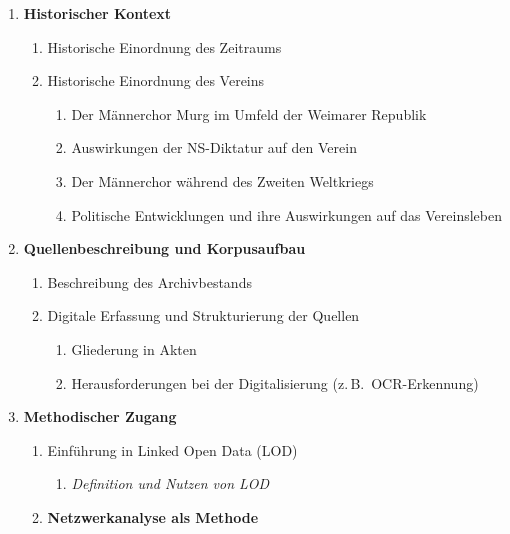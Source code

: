 \documentclass[12pt, a4paper, ngerman, bidi=default]{article}
\begin{document}
\begin{spacing}{1.5}
\begin{enumerate}
    \item \textbf{Historischer Kontext}
        \begin{enumerate}
        \item \small{ Historische Einordnung des Zeitraums}
        \item \small{ Historische Einordnung des Vereins}
            \begin{enumerate}
            \item \small Der Männerchor Murg im Umfeld der Weimarer Republik
            \item \small Auswirkungen der NS-Diktatur auf den Verein 
            \item \small Der Männerchor während des Zweiten Weltkriegs
            \item \small Politische Entwicklungen und ihre Auswirkungen auf das Vereinsleben
    \end{enumerate}
\end{enumerate}
    
    \item \textbf{Quellenbeschreibung und Korpusaufbau}
    \begin{enumerate}
        \item \small Beschreibung des Archivbestands
        \item \small Digitale Erfassung und Strukturierung der Quellen
        \begin{enumerate}
            \item \small Gliederung in Akten
            \item \small Herausforderungen bei der Digitalisierung (z.\,B.\ OCR-Erkennung)
        \end{enumerate}
    \end{enumerate}
    
    \item \textbf{Methodischer Zugang}
    \begin{enumerate}
        \item \small Einführung in Linked Open Data (LOD)
        \begin{enumerate}
            \item \small \textit{Definition und Nutzen von LOD}
        \end{enumerate}
        \item \textbf{Netzwerkanalyse als Methode}
    \end{enumerate}
    

\end{enumerate}
\end{spacing}
\end{document}
